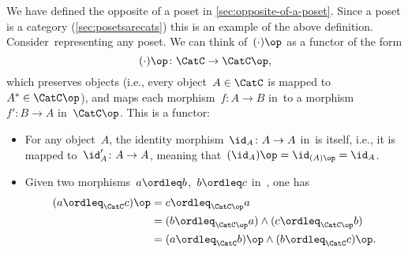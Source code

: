 \begin{example}
    We have defined the opposite of a poset in \cref{sec:opposite-of-a-poset}.
    Since a poset is a category (\cref{sec:posetsarecats})
    this is an example of the above definition. Consider~\CatC representing any poset. We can think of~$(\cdot)\op$ as a functor of the form
    \begin{equation}
    (\cdot)
        \op\colon \CatC \to \CatC\op,
    \end{equation}
    which preserves objects (i.e., every object~$A \in \CatC$ is mapped to~$A^*\in \CatC\op$), and maps each morphism~$f\colon A\to B$ in~\CatC to a morphism~$f'\colon B\to A$ in~$\CatC\op$. This is a functor:
    \begin{itemize}
        \item For any object~$A$, the identity morphism~$\id_A\colon A\to A$ in~\CatC is itself, i.e., it is mapped to~$\id_A'\colon A\to A$, meaning that~$(\id_A)\op=\id_{(A)\op}=\id_A$.
        \item Given two morphisms~$a\ordleq b$,~$b\ordleq c$ in~\CatC, one has
        \begin{equation}
            \begin{aligned}
            (a\ordleq_{\CatC} c)
                \op &=c\ordleq_{\CatC\op} a\\
                &=(b\ordleq_{\CatC\op} a)\wedge (c\ordleq_{\CatC\op}b)\\
                &=(a\ordleq_{\CatC} b)\op \wedge (b\ordleq_{\CatC} c)\op.
            \end{aligned}
        \end{equation}
    \end{itemize}
\end{example}








